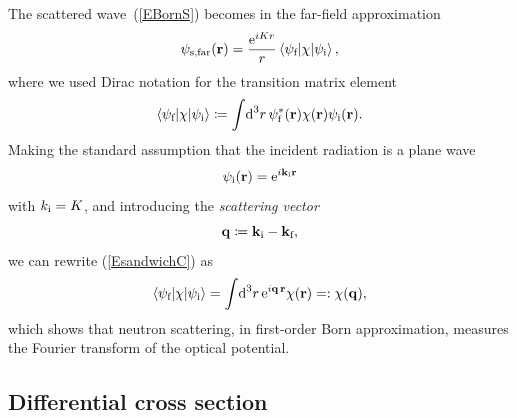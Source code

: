 The scattered wave~(\ref{EBornS})
becomes in the far-field approximation 
\begin{equation}\label{EsandwichC}
  \psi_\text{s,far}(\mathbf{r})
  = \frac{\text{e}^{iKr}}{r}
    \left\langle \psi_{\text{f}}|\chi|\psi_{\text{i}}\right\rangle,
\end{equation}
%
where we used Dirac notation for the transition matrix element
%
\begin{equation}\label{Etrama}
  \left\langle \psi_{\text{f}}|\chi|\psi_{\text{i}}\right\rangle
  \coloneqq  \int\!\text{d}^3r\, \psi^*_{\text{f}}(\mathbf{r})\chi(\mathbf{r})\psi_{\text{i}}(\mathbf{r}).
\end{equation}
%
Making the standard assumption
that the incident radiation is a plane wave
\begin{equation}\label{EPsi0Plane}
  \psi_{\text{i}}(\mathbf{r})=\text{e}^{i \mathbf{k}_{\text{i}} \mathbf{r}}
\end{equation}
with $k_{\text{i}}=K$,
and introducing the \textit{scattering vector}
%
\begin{equation}
  \mathbf{q}\coloneqq \mathbf{k}_{\text{i}}-\mathbf{k}_{\text{f}},
\end{equation}
%
we can rewrite (\ref{EsandwichC}) as
\begin{equation}\label{EBornQ}
  \left\langle \psi_{\text{f}}|\chi|\psi_{\text{i}}\right\rangle
  = \int\!\text{d}^3r\, \text{e}^{i\mathbf{q}\,\mathbf{r}}\chi(\mathbf{r})
  =: \chi(\mathbf{q}),
\end{equation}
%
which shows that neutron scattering,
in first-order Born approximation,
measures the Fourier transform
of the optical potential.
%

%

\subsection{Differential cross section}

